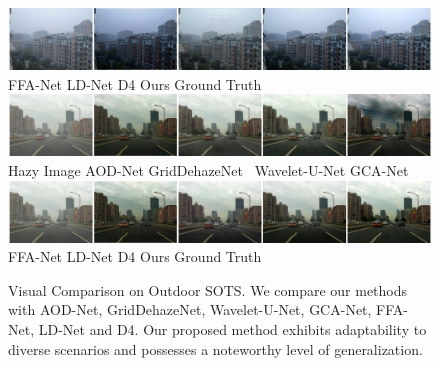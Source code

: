 \documentclass[lettersize,journal]{IEEEtran}
\begin{document}
\begin{figure}[ph!t]
    \includegraphics[width=16.5cm]{2_2.jpg} \\
    FFA-Net\cite{qin2020ffa} \qquad\quad\; LD-Net\cite{ullah2021light} \qquad\qquad\; D4\cite{yang2022d4} \qquad\qquad\qquad\; Ours \qquad\qquad\quad Ground Truth \\
    
    \includegraphics[width=16.5cm]{5_1.jpg} \\
    Hazy Image\qquad\quad\;\; AOD-Net\cite{li2017aod} \qquad GridDehazeNet\cite{liu2019griddehazenet} \;\, Wavelet-U-Net\cite{yang2019wavelet} \qquad GCA-Net\cite{chen2019gated}\\
    
    \includegraphics[width=16.5cm]{5_2.jpg} \\
    FFA-Net\cite{qin2020ffa} \qquad\quad\; LD-Net\cite{ullah2021light} \qquad\qquad\; D4\cite{yang2022d4} \qquad\qquad\qquad\; Ours \qquad\qquad\quad Ground Truth \\
    
    \caption{Visual Comparison on Outdoor SOTS. We compare our methods with AOD-Net\cite{li2017aod}, GridDehazeNet\cite{liu2019griddehazenet}, Wavelet-U-Net\cite{yang2019wavelet}, GCA-Net\cite{chen2019gated}, FFA-Net\cite{qin2020ffa}, LD-Net\cite{ullah2021light} and D4\cite{yang2022d4}. %
    Our proposed method exhibits adaptability to diverse scenarios and possesses a noteworthy level of generalization.}
    \label{sots}
\end{figure}
\end{document}

